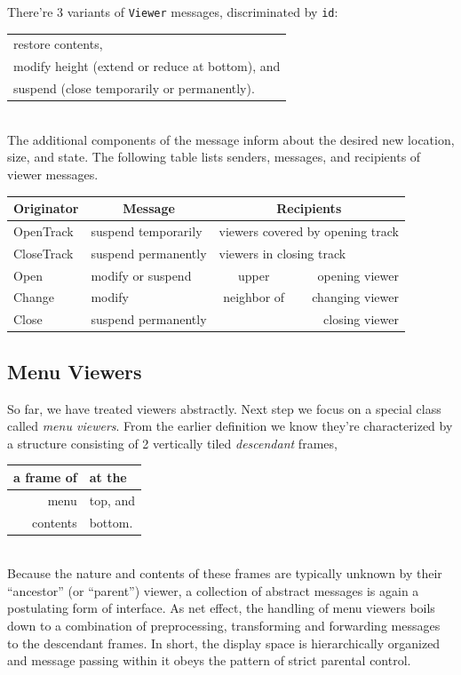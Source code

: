 There're 3 variants of \verb|Viewer| messages, discriminated by \verb|id|:
\begin{table}[h!]
  \centering
  \begin{tabular}{l}
    restore contents, \\
    modify height (extend or reduce at bottom), and \\
    suspend (close temporarily or permanently).
  \end{tabular}
\end{table}
\\The additional components of the message inform about the desired new location, size, and state.
The following table lists senders, messages, and recipients of viewer messages.
\begin{table}[h!]
  \setlength{\tabcolsep}{1pt}
  \begin{tabular}{l|l|c r}
    \small{Originator} & \multicolumn{1}{c}{Message} & \multicolumn{2}{|c}{Recipients} \\\hline
    \small{OpenTrack}  & \small{suspend temporarily}
                       & \multicolumn{2}{l}{\small{viewers covered by opening track}} \\
    \small{CloseTrack} & \small{suspend permanently}
                       & \multicolumn{2}{l}{\small{viewers in closing track}}         \\
    \small{Open}       & \small{modify or suspend}
                       &        upper        &  opening viewer \\
    \small{Change}     & \small{modify}
                       & \small{neighbor of} & changing viewer \\
    \small{Close}      & \small{suspend permanently} & \multicolumn{2}{r}{closing viewer}
  \end{tabular}
\end{table}

\subsection{Menu Viewers}
\label{sub:menuviewers}
So far, we have treated viewers abstractly.
Next step we focus on a special class called \emph{menu viewers}.
From the earlier definition we know they're characterized by a structure
consisting of 2 vertically tiled \emph{descendant} frames,
\begin{table}[h!]
  \centering
  \begin{tabular}{r l}
    a frame of & at the \\\hline
    menu       & top, and \\
    contents   & bottom.
  \end{tabular}
\end{table}
\\Because the nature and contents of these frames are typically unknown
by their “ancestor” (or “parent”) viewer,
a collection of abstract messages is again a postulating form of interface.
As net effect, the handling of menu viewers boils down to a combination
of preprocessing, transforming and forwarding messages to the descendant frames.
In short, the display space is hierarchically organized and message passing within it
obeys the pattern of strict parental control.

